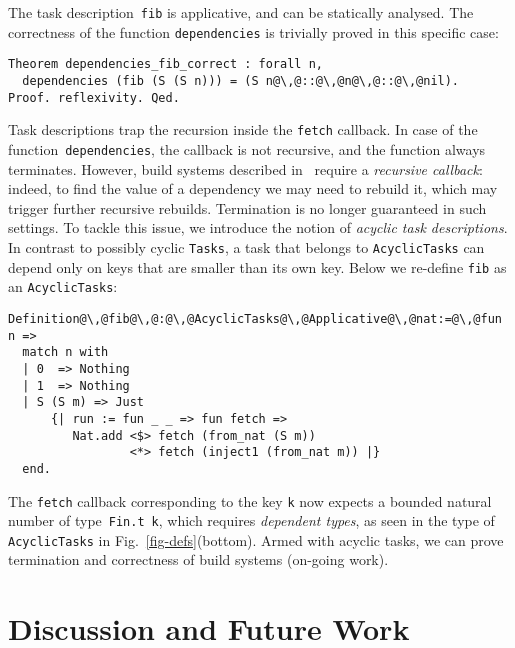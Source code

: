 \documentclass[sigplan]{acmart}\settopmatter{printfolios=true,printccs=false,printacmref=false}
\newcommand{\hs}{\texttt}
\newcommand{\coq}{\texttt}
\begin{document}
The task description~\hs{fib} is applicative, and can be statically analysed.
The correctness of the function \hs{dependencies} is trivially proved in this
specific case:

\vspace{-1mm}
\begin{verbatim}
Theorem dependencies_fib_correct : forall n,
  dependencies (fib (S (S n))) = (S n@\,@::@\,@n@\,@::@\,@nil).
Proof. reflexivity. Qed.
\end{verbatim}
\vspace{-1mm}

Task descriptions trap the recursion inside the \hs{fetch} callback. In case of
the function~\hs{dependencies}, the callback is not recursive, and the function
always terminates. However, build systems described in~\cite{Mokhov2018icfp}
require a \emph{recursive callback}: indeed, to find the value of a dependency we
may need to rebuild it, which may trigger further recursive rebuilds.
Termination is no longer guaranteed in such settings. To tackle this issue, we
introduce the notion of \emph{acyclic task descriptions}. In contrast to
possibly cyclic \hs{Tasks}, a task that belongs to \hs{AcyclicTasks}
can depend only on keys that are smaller than its own key. Below we re-define
\hs{fib} as an \hs{AcyclicTasks}:

\vspace{-1mm}
\begin{verbatim}
Definition@\,@fib@\,@:@\,@AcyclicTasks@\,@Applicative@\,@nat:=@\,@fun n =>
  match n with
  | 0  => Nothing
  | 1  => Nothing
  | S (S m) => Just
      {| run := fun _ _ => fun fetch =>
         Nat.add <$> fetch (from_nat (S m))
                 <*> fetch (inject1 (from_nat m)) |}
  end.
\end{verbatim}
\vspace{-1mm}

\noindent
The \hs{fetch} callback corresponding to the key \hs{k} now expects a bounded
natural number of type~\hs{Fin.t}~\hs{k}, which requires \emph{dependent types},
as seen in the type of \hs{AcyclicTasks} in Fig.~\ref{fig-defs}(bottom). Armed
with acyclic tasks, we can prove termination and correctness of build systems
(on-going work).


\vspace{-2mm}
\section{Discussion and Future Work}\label{sec-discussion}
\vspace{-1mm}
\end{document}
